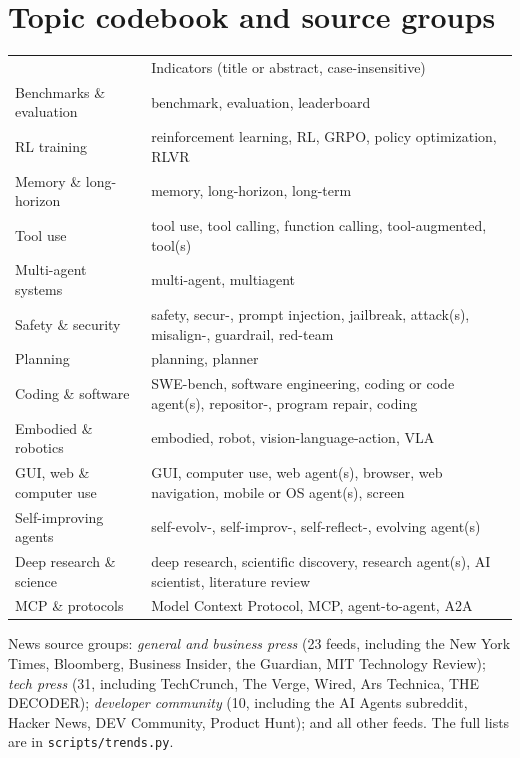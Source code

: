 \documentclass[10.5pt]{article}
\newcommand{\throw}{\rowcolor{thead}}
\newcommand{\hd}[1]{{\color{white}\sorasemi\scriptsize #1}}
\begin{document}
\section{Topic codebook and source groups}
\begin{table}[!htbp]
  \centering\scriptsize
  \begin{tabularx}{\linewidth}{lX}
    \throw \hd{Topic} & \hd{Indicators (title or abstract, case-insensitive)} \\
    Benchmarks \& evaluation & benchmark, evaluation, leaderboard \\
    \rowcolor{lav} RL training & reinforcement learning, RL, GRPO, policy optimization, RLVR \\
    Memory \& long-horizon & memory, long-horizon, long-term \\
    \rowcolor{lav} Tool use & tool use, tool calling, function calling, tool-augmented, tool(s) \\
    Multi-agent systems & multi-agent, multiagent \\
    \rowcolor{lav} Safety \& security & safety, secur-, prompt injection, jailbreak, attack(s), misalign-, guardrail, red-team \\
    Planning & planning, planner \\
    \rowcolor{lav} Coding \& software & SWE-bench, software engineering, coding or code agent(s), repositor-, program repair, coding \\
    Embodied \& robotics & embodied, robot, vision-language-action, VLA \\
    \rowcolor{lav} GUI, web \& computer use & GUI, computer use, web agent(s), browser, web navigation, mobile or OS agent(s), screen \\
    Self-improving agents & self-evolv-, self-improv-, self-reflect-, evolving agent(s) \\
    \rowcolor{lav} Deep research \& science & deep research, scientific discovery, research agent(s), AI scientist, literature review \\
    MCP \& protocols & Model Context Protocol, MCP, agent-to-agent, A2A \\
    \bottomrule
  \end{tabularx}
\end{table}
News source groups: \emph{general and business press} (23 feeds, including the New York Times, Bloomberg, Business Insider, the Guardian, MIT Technology Review); \emph{tech press} (31, including TechCrunch, The Verge, Wired, Ars Technica, THE DECODER); \emph{developer community} (10, including the AI Agents subreddit, Hacker News, DEV Community, Product Hunt); and all other feeds. The full lists are in \texttt{scripts/trends.py}.
\end{document}
